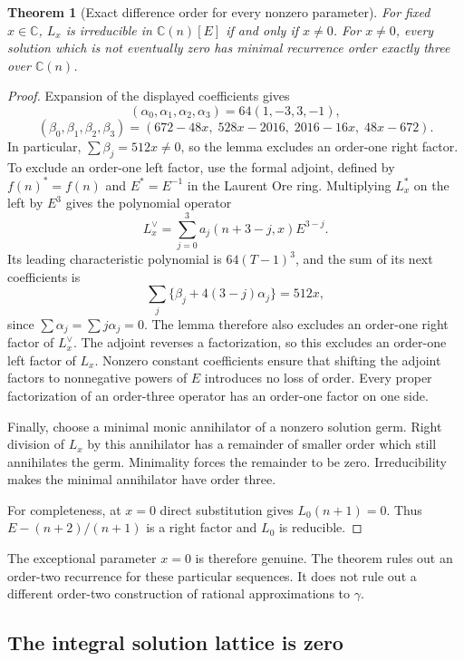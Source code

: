 \documentclass[11pt,a4paper]{article}
\newtheorem{theorem}{Theorem}[section]
\theoremstyle{definition}
\theoremstyle{remark}
\numberwithin{equation}{section}
\begin{document}
\begin{theorem}[Exact difference order for every nonzero parameter]
\label{p3:thm:ga-irreducible}
For fixed $x\in\mathbb C$, $L_x$ is irreducible in
$\mathbb C(n)[E]$ if and only if $x\ne0$. For $x\ne0$,
every solution which is not eventually zero
has minimal recurrence order exactly three over $\mathbb C(n)$.
\end{theorem}
\begin{proof}
Expansion of the displayed coefficients gives
\[
 (\alpha_0,\alpha_1,\alpha_2,\alpha_3)=64(1,-3,3,-1),
\]
\[
 (\beta_0,\beta_1,\beta_2,\beta_3)
 =(672-48x,\;528x-2016,\;2016-16x,\;48x-672).
\]
In particular, $\sum\beta_j=512x\ne0$, so the lemma excludes
an order-one right factor. To exclude an order-one left factor,
use the formal adjoint, defined by $f(n)^*=f(n)$ and $E^*=E^{-1}$
in the Laurent Ore ring. Multiplying $L_x^*$ on the left by $E^3$
gives the polynomial operator
\[
 L_x^\vee=\sum_{j=0}^3 a_j(n+3-j,x)E^{3-j}.
\]
Its leading characteristic polynomial is
$64(T-1)^3$, and the sum of its next coefficients is
\[
 \sum_j\{\beta_j+4(3-j)\alpha_j\}=512x,
\]
since $\sum\alpha_j=\sum j\alpha_j=0$.
The lemma therefore also excludes an order-one right factor of
$L_x^\vee$. The adjoint reverses a factorization, so this excludes
an order-one left factor of $L_x$. Nonzero constant coefficients
ensure that shifting the adjoint factors to nonnegative powers of
$E$ introduces no loss of order. Every proper factorization of an
order-three operator has an order-one factor on one side.

Finally, choose a minimal monic annihilator of a nonzero solution
germ. Right division of $L_x$ by this annihilator has a remainder
of smaller order which still annihilates the germ. Minimality
forces the remainder to be zero. Irreducibility makes the minimal
annihilator have order three.

For completeness, at $x=0$ direct substitution gives $L_0(n+1)=0$.
Thus $E-(n+2)/(n+1)$ is a right factor and $L_0$ is reducible.
\end{proof}

The exceptional parameter $x=0$ is therefore genuine.
The theorem rules out an order-two recurrence for these particular
sequences. It does not rule out a different order-two construction
of rational approximations to $\gamma$.

\subsection{The integral solution lattice is zero}
\end{document}
